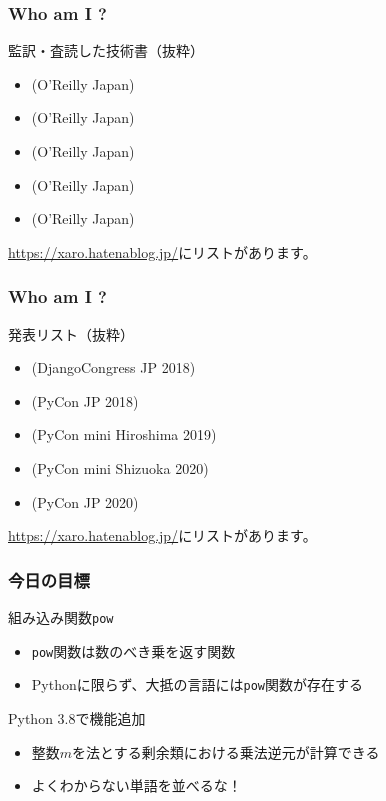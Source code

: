 \documentclass[aspectratio=169,dvipdfmx,14pt,notheorems]{beamer}
\theoremstyle{definition}
\begin{document}
\begin{frame}\frametitle{Who am I ?}

\begin{block}{監訳・査読した技術書（抜粋）}
\begin{itemize}
\item {}(O'Reilly Japan)
\item {}(O'Reilly Japan)

\item {}(O'Reilly Japan)
\item {}(O'Reilly Japan)
\item {}(O'Reilly Japan) 
\end{itemize}
\end{block}
\url{https://xaro.hatenablog.jp/}にリストがあります。
\end{frame}

\begin{frame}\frametitle{Who am I ?}

\begin{block}{発表リスト（抜粋）}
\begin{itemize}
\item {}(DjangoCongress JP 2018)
\item {}(PyCon JP 2018)
\item {}(PyCon mini Hiroshima 2019)
\item {}(PyCon mini Shizuoka 2020)
\item {}(PyCon JP 2020)
\end{itemize}
\end{block}
\url{https://xaro.hatenablog.jp/}にリストがあります。
\end{frame}

\begin{frame}\frametitle{今日の目標}

\begin{block}{組み込み関数\texttt{pow}}
\begin{itemize}
\item \texttt{pow}関数は数のべき乗を返す関数
\item Pythonに限らず、大抵の言語には\texttt{pow}関数が存在する
\end{itemize}
\end{block}

\begin{exampleblock}{Python 3.8で機能追加}
\begin{itemize}
\item 整数$m$を法とする剰余類における乗法逆元が計算できる
\item よくわからない単語を並べるな！
\end{itemize}
\end{exampleblock}
\end{frame}
\end{document}
